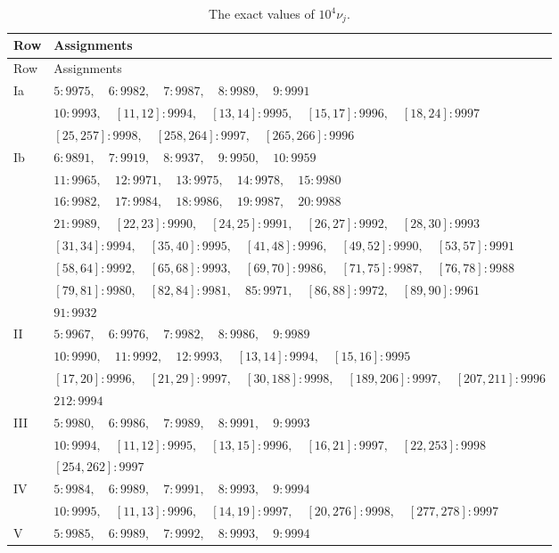 \begin{longtable}{@{}lp{}@{}}
\caption{The exact values of $10^4\nu_j$.}\label{bc:nu-table}\\
\toprule Row&Assignments\\\midrule\endfirsthead
\toprule Row&Assignments\\\midrule\endhead
Ia & $5:9975,\quad 6:9982,\quad 7:9987,\quad 8:9989,\quad 9:9991$\\
 & $10:9993,\quad [11,12]:9994,\quad [13,14]:9995,\quad [15,17]:9996,\quad [18,24]:9997$\\
 & $[25,257]:9998,\quad [258,264]:9997,\quad [265,266]:9996$\\
Ib & $6:9891,\quad 7:9919,\quad 8:9937,\quad 9:9950,\quad 10:9959$\\
 & $11:9965,\quad 12:9971,\quad 13:9975,\quad 14:9978,\quad 15:9980$\\
 & $16:9982,\quad 17:9984,\quad 18:9986,\quad 19:9987,\quad 20:9988$\\
 & $21:9989,\quad [22,23]:9990,\quad [24,25]:9991,\quad [26,27]:9992,\quad [28,30]:9993$\\
 & $[31,34]:9994,\quad [35,40]:9995,\quad [41,48]:9996,\quad [49,52]:9990,\quad [53,57]:9991$\\
 & $[58,64]:9992,\quad [65,68]:9993,\quad [69,70]:9986,\quad [71,75]:9987,\quad [76,78]:9988$\\
 & $[79,81]:9980,\quad [82,84]:9981,\quad 85:9971,\quad [86,88]:9972,\quad [89,90]:9961$\\
 & $91:9932$\\
II & $5:9967,\quad 6:9976,\quad 7:9982,\quad 8:9986,\quad 9:9989$\\
 & $10:9990,\quad 11:9992,\quad 12:9993,\quad [13,14]:9994,\quad [15,16]:9995$\\
 & $[17,20]:9996,\quad [21,29]:9997,\quad [30,188]:9998,\quad [189,206]:9997,\quad [207,211]:9996$\\
 & $212:9994$\\
III & $5:9980,\quad 6:9986,\quad 7:9989,\quad 8:9991,\quad 9:9993$\\
 & $10:9994,\quad [11,12]:9995,\quad [13,15]:9996,\quad [16,21]:9997,\quad [22,253]:9998$\\
 & $[254,262]:9997$\\
IV & $5:9984,\quad 6:9989,\quad 7:9991,\quad 8:9993,\quad 9:9994$\\
 & $10:9995,\quad [11,13]:9996,\quad [14,19]:9997,\quad [20,276]:9998,\quad [277,278]:9997$\\
V & $5:9985,\quad 6:9989,\quad 7:9992,\quad 8:9993,\quad 9:9994$\\

\end{longtable}
